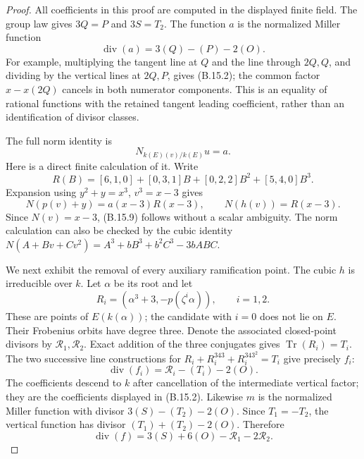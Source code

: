 \begin{proof}
All coefficients in this proof are computed in the
displayed finite field.  The group law gives
$3Q=P$ and $3S=T_2$.  The function $a$ is the normalized
Miller function
\[
                  \operatorname{div}(a)=3(Q)-(P)-2(O).
                                                               \tag{B.15.8}
\]
For example, multiplying the tangent line at $Q$ and the
line through $2Q,Q$, and dividing by the vertical lines
at $2Q,P$, gives (B.15.2); the common factor
$x-x(2Q)$ cancels in both numerator components.
This is an equality of rational functions with the
retained tangent leading coefficient, rather than an
identification of divisor classes.

The full norm identity is
\[
                    N_{k(E)(v)/k(E)}u=a.                  \tag{B.15.9}
\]
Here is a direct finite calculation of it.  Write
\[
 R(B)=[6,1,0]+[0,3,1]B+[0,2,2]B^2+[5,4,0]B^3.
\]
Expansion using $y^2+y=x^3$, $v^3=x-3$ gives
\[
 N(p(v)+y)=a(x-3)R(x-3),\qquad N(h(v))=R(x-3).
                                                               \tag{B.15.10}
\]
Since $N(v)=x-3$, (B.15.9) follows without a scalar
ambiguity.  The norm calculation can also be checked by
the cubic identity
$N(A+Bv+Cv^2)=A^3+bB^3+b^2C^3-3bABC$.

We next exhibit the removal of every auxiliary
ramification point.  The cubic $h$ is irreducible over
$k$.  Let $\alpha$ be its root and let
\[
 R_i=(\alpha^3+3,-p(\zeta^i\alpha)),\qquad i=1,2.
                                                               \tag{B.15.11}
\]
These are points of $E(k(\alpha))$; the candidate with
$i=0$ does not lie on $E$.  Their Frobenius orbits have
degree three.  Denote the associated closed-point
divisors by $\mathcal R_1,\mathcal R_2$.
Exact addition of the three conjugates gives
$\operatorname{Tr}(R_i)=T_i$.
The two successive line constructions for
$R_i+R_i^{343}+R_i^{343^2}=T_i$ give precisely $f_i$:
\[
 \operatorname{div}(f_i)=\mathcal R_i-(T_i)-2(O).
                                                               \tag{B.15.12}
\]
The coefficients descend to $k$ after cancellation of
the intermediate vertical factor; they are the
coefficients displayed in (B.15.2).
Likewise $m$ is the normalized Miller function with
divisor $3(S)-(T_2)-2(O)$.  Since $T_1=-T_2$, the
vertical function has divisor
$(T_1)+(T_2)-2(O)$.  Therefore
\[
 \operatorname{div}(f)
       =3(S)+6(O)-\mathcal R_1-2\mathcal R_2.               \tag{B.15.13}
\]


\end{proof}
